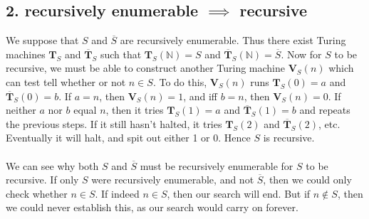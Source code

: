 \subsection*{2. recursively enumerable $\implies$ recursive  }
We suppose that $S$ and $\overline{S}$ are recursively enumerable. Thus there exist Turing machines $\mathbf{T}_S$ and  $\overline{\mathbf{T}}_S$ such that $\mathbf{T}_S(\mathbb{N})=S$ and $\overline{\mathbf{T}}_S(\mathbb{N})=\overline{S}$. Now for $S$ to be recursive, we must be able to construct another Turing machine $\mathbf{V}_S(n)$ which can test tell whether or not $n\in S$. To do this, $\mathbf{V}_S(n)$ runs $\mathbf{T}_S(0)=a$ and  $\overline{\mathbf{T}}_S(0)=b$. If $a=n$, then $\mathbf{V}_S(n)=1$, and iff $b=n$, then $\mathbf{V}_S(n)=0$. If neither $a$ nor $b$ equal $n$, then it tries $\mathbf{T}_S(1)=a$ and  $\overline{\mathbf{T}}_S(1)=b$ and repeats the previous steps. If it still hasn't halted, it tries  $\mathbf{T}_S(2)$ and  $\overline{\mathbf{T}}_S(2)$, etc. Eventually it will halt, and spit out either 1 or 0. Hence $S$ is recursive. \\ \\ We can see why both $S$ and $\overline{S}$ must be recursively enumerable for $S$ to be recursive. If only $S$ were recursively enumerable, and not $\overline{S}$, then we could only check whether $n\in S$. If indeed $n\in S$, then our search will end. But if $n\notin S$, then we could never establish this, as our search would carry on forever.    
